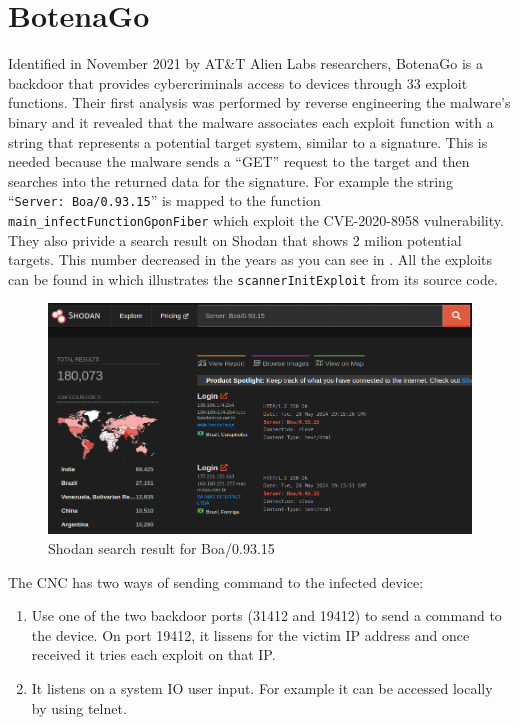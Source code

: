 \section{BotenaGo}

Identified in November 2021 by AT\&T Alien Labs researchers, BotenaGo is a backdoor that provides cybercriminals access to devices through 33 exploit functions. Their first analysis was performed by reverse engineering the malware's binary and it revealed that the malware associates each exploit function with a string that represents a potential target system, similar to a signature. This is needed because the malware sends a ``GET'' request to the target and then searches into the returned data for the signature. For example the string ``\texttt{Server: Boa/0.93.15}'' is mapped to the function \texttt{main\_infectFunctionGponFiber} which exploit the CVE-2020-8958 vulnerability. They also privide a search result on Shodan that shows 2 milion potential targets. This number decreased in the years as you can see in . All the exploits can be found in  which illustrates the \texttt{scannerInitExploit} from its source code.

\begin{figure}[ht]
    \centering
    \includegraphics[scale=0.4]{resources/images/boa-shodan.png}
    \caption{Shodan search result for Boa/0.93.15}
    \label{fig:boa-shodan}
\end{figure}

The CNC has two ways of sending command to the infected device:

\begin{enumerate}
    \item Use one of the two backdoor ports (31412 and 19412) to send a command to the device. On port 19412, it lissens for the victim IP address and once received it tries each exploit on that IP.
    \item It listens on a system IO user input. For example it can be accessed locally by using telnet. 
\end{enumerate}

